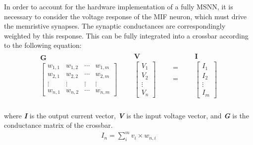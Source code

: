 \noindent In order to account for the hardware implementation of a fully MSNN, it is necessary to consider the voltage response of the MIF neuron, which must drive the memristive synapses. The synaptic conductances are correspondingly weighted by this response. This can be fully integrated into a crossbar according to the following equation:
\begin{align}
\begin{matrix}
& \textbf{G} & \\
& \begin{bmatrix}
    w_{1,1} & w_{1,2} & \cdots & w_{1, m} \\
    w_{2,1} & w_{2,2} & \cdots & w_{2, m} \\
    \vdots & \vdots & \vdots & \vdots \\
    w_{n, 1} & w_{n, 2} & \cdots & w_{n, m}
\end{bmatrix} &\\
\end{matrix}
\begin{matrix}
  & \textbf{V} & \\
 & \begin{bmatrix}
V_{1} \\
V_{2} \\
\vdots \\
V_{n}
\end{bmatrix} &\\
\end{matrix}
\begin{matrix}
 & = & \\
\\
\\
&=&  \\
\\
\end{matrix}
\begin{matrix}
  & \textbf{I} & \\
 & \begin{bmatrix}
I_{1} \\
I_{2} \\
\vdots \\
I_{m}
\end{bmatrix} &\\
\end{matrix}
\label{eq:4.15}
\end{align}

\noindent where \textbf{\textit{I}} is the output current vector, \textbf{\textit{V}} is the input voltage vector, and \textbf{\textit{G}} is the conductance matrix of the crossbar.
\begin{align}
I_n = \sum_{i}^{m} v_i \times w_{n,i} \label{eq:4.16}
\end{align}

